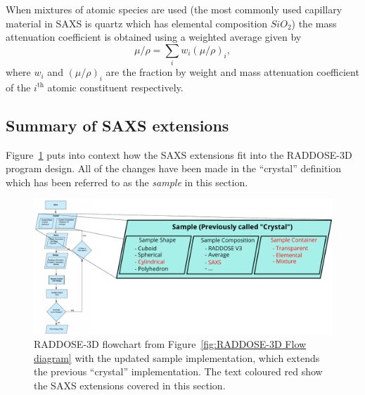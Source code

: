When mixtures of atomic species are used (the most commonly used capillary material in SAXS is quartz which has elemental composition $SiO_2$) the mass attenuation coefficient is obtained using a weighted average given by
\begin{equation}
    \mu/\rho = \sum_i w_i (\mu/\rho)_i,
\end{equation}
where $w_i$ and $(\mu/\rho)_i$ are the fraction by weight and mass attenuation coefficient of the $i^{\text{th}}$ atomic constituent respectively.

\subsection{Summary of SAXS extensions}
\label{sub:Summary of SAXS extensions}
Figure~\ref{fig:Updated RADDOSE-3D Flow diagram} puts into context how the SAXS extensions fit into the RADDOSE-3D program design.
All of the changes have been made in the ``crystal'' definition which has been referred to as the \textit{sample} in this section.
\begin{figure}
    \centering
    \includegraphics[width=1\textwidth]{figures/saxs/Sample_definitions.pdf}
    \caption[Updated flow diagram illustrating the structure of the RADDOSE-3D code with the SAXS extensions.]{RADDOSE-3D flowchart from Figure~\ref{fig:RADDOSE-3D Flow diagram} with the updated sample implementation, which extends the previous ``crystal'' implementation.
    The text coloured red show the SAXS extensions covered in this section.}
    \label{fig:Updated RADDOSE-3D Flow diagram}
\end{figure}

